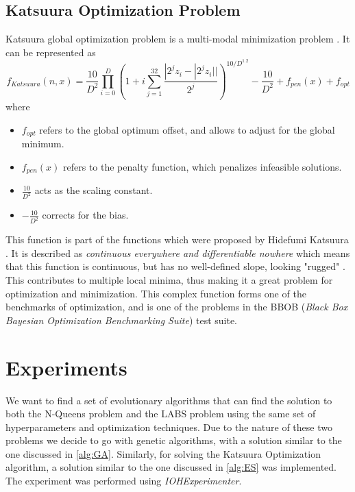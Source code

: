 \documentclass{article}
\begin{document}
\subsection{Katsuura Optimization Problem} \label{sec:katsuura}
Katsuura global optimization problem is a multi-modal minimization problem \cite{katsuura-source}. It can be represented as 
\begin{equation*}
     f_{Katsuura}(n, x) = \frac{10}{D^2} \prod_{i=0}^{D} \left ( 1 + i \sum_{j=1}^{32} \frac{|2^jz_i- |2^j z_i||}{2^j} \right )^{10/D^{1.2}}-\frac{10}{D^2} + f_{pen}(x) + f_{opt}
\end{equation*}
where 
\begin{itemize}
    \item $f_{opt}$ refers to the global optimum offset, and allows to adjust for the global minimum. 
    \item $f_{pen}(x)$ refers to the penalty function, which penalizes infeasible solutions. 
    \item $\frac{10}{D^2}$ acts as the scaling constant.  
    \item $-\frac{10}{D^2}$ corrects for the bias.
\end{itemize}
This function is part of the functions which were proposed by Hidefumi Katsuura \cite{katsuura-actualpaper}. It is described as \textit{continuous everywhere and differentiable nowhere} which means that this function is continuous, but has no well-defined slope, looking "rugged" \cite{rugged-boi}. This contributes to multiple local minima, thus making it a great problem for optimization and minimization. This complex function forms one of the benchmarks of optimization, and is one of the problems in the BBOB  (\textit{Black Box Bayesian Optimization Benchmarking Suite}) test suite.  \\

\section{Experiments} \label{sec:exp-results}
We want to find a set of evolutionary algorithms that can find the solution to both the N-Queens problem and the LABS problem using the same set of hyperparameters and optimization techniques. Due to the nature of these two problems we decide to go with genetic algorithms, with a solution similar to the one discussed in \ref{alg:GA}. Similarly, for solving the Katsuura Optimization algorithm, a solution similar to the one discussed in \ref{alg:ES} was implemented.   \\
The experiment was performed using \textit{IOHExperimenter}. \cite{IOHexperimenter}
\end{document}

